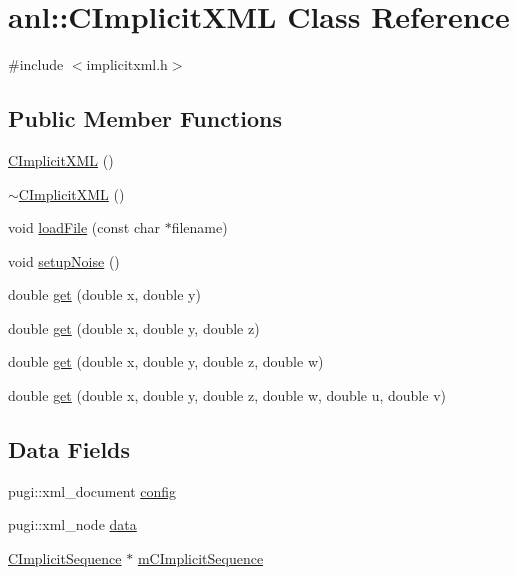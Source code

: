 \hypertarget{classanl_1_1CImplicitXML}{
\section{anl::CImplicitXML Class Reference}
\label{classanl_1_1CImplicitXML}
}


{\ttfamily \#include $<$implicitxml.h$>$}\subsection*{Public Member Functions}
\begin{DoxyCompactItemize}
\item 
\hyperlink{classanl_1_1CImplicitXML_a2b530401942e354d6b1e280d6dd6e573}{CImplicitXML} ()
\item 
\hyperlink{classanl_1_1CImplicitXML_a5aa6729363fc5502bdab35fb8bcbb9cd}{$\sim$CImplicitXML} ()
\item 
void \hyperlink{classanl_1_1CImplicitXML_a835b31bdfda2b630702871d4b874430c}{loadFile} (const char $\ast$filename)
\item 
void \hyperlink{classanl_1_1CImplicitXML_a7ce27d116ac066cf791c9ecd1906e935}{setupNoise} ()
\item 
double \hyperlink{classanl_1_1CImplicitXML_ac69233990a7d20217fb13506f5b3b73a}{get} (double x, double y)
\item 
double \hyperlink{classanl_1_1CImplicitXML_a712467ddab5312c4b88a15f160ebfdc7}{get} (double x, double y, double z)
\item 
double \hyperlink{classanl_1_1CImplicitXML_a6a1ee214ecc3286da0d425b92c46445f}{get} (double x, double y, double z, double w)
\item 
double \hyperlink{classanl_1_1CImplicitXML_a6bdd767f337be91cc3cf95e4c172a8a3}{get} (double x, double y, double z, double w, double u, double v)
\end{DoxyCompactItemize}
\subsection*{Data Fields}
\begin{DoxyCompactItemize}
\item 
pugi::xml\_\-document \hyperlink{classanl_1_1CImplicitXML_a50c5be8373543290385ac51d6608af87}{config}
\item 
pugi::xml\_\-node \hyperlink{classanl_1_1CImplicitXML_ad32053dc56a8e932b64101d1eed12a78}{data}
\item 
\hyperlink{classanl_1_1CImplicitSequence}{CImplicitSequence} $\ast$ \hyperlink{classanl_1_1CImplicitXML_ad006f5e2fa937d44470ecc769c8ec404}{mCImplicitSequence}
\end{DoxyCompactItemize}


